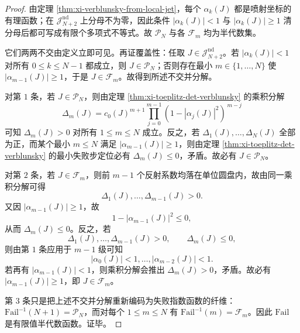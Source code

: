 \begin{proof}
由定理 \ref{thm:xi-verblunsky-from-local-jet}，每个 \(\alpha_k(J)\) 都是喷射坐标的有理函数；在 \(\mathcal J_{N+2}^{\mathrm{nd}}\) 上分母不为零，因此条件 \(|\alpha_k(J)|<1\) 与 \(|\alpha_k(J)|\ge 1\) 清分母后都可写成有限个多项式不等式。故 \(\mathcal P_N\) 与各 \(\mathcal F_m\) 均为半代数集。

它们两两不交由定义立即可见。再证覆盖性：任取 \(J\in \mathcal J_{N+2}^{\mathrm{nd}}\)。若 \(|\alpha_k(J)|<1\) 对所有 \(0\le k\le N-1\) 都成立，则 \(J\in \mathcal P_N\)；否则存在最小 \(m\in\{1,\dots,N\}\) 使 \(|\alpha_{m-1}(J)|\ge 1\)，于是 \(J\in \mathcal F_m\)。故得到所述不交并分解。

对第 \(1\) 条，若 \(J\in \mathcal P_N\)，则由定理 \ref{thm:xi-toeplitz-det-verblunsky} 的乘积分解
\[
\Delta_m(J)
=
c_0(J)^{m+1}\prod_{j=0}^{m-1}(1-|\alpha_j(J)|^2)^{\,m-j}
\]
可知 \(\Delta_m(J)>0\) 对所有 \(1\le m\le N\) 成立。反之，若 \(\Delta_1(J),\dots,\Delta_N(J)\) 全部为正，而某个最小 \(m\le N\) 满足 \(|\alpha_{m-1}(J)|\ge 1\)，则由定理 \ref{thm:xi-toeplitz-det-verblunsky} 的最小失败步定位必有 \(\Delta_m(J)\le 0\)，矛盾。故必有 \(J\in \mathcal P_N\)。

对第 \(2\) 条，若 \(J\in \mathcal F_m\)，则前 \(m-1\) 个反射系数均落在单位圆盘内，故由同一乘积分解可得
\[
\Delta_1(J),\dots,\Delta_{m-1}(J)>0.
\]
又因 \(|\alpha_{m-1}(J)|\ge 1\)，故
\[
1-|\alpha_{m-1}(J)|^2\le 0,
\]
从而 \(\Delta_m(J)\le 0\)。反之，若
\[
\Delta_1(J),\dots,\Delta_{m-1}(J)>0,
\qquad
\Delta_m(J)\le 0,
\]
则由第 \(1\) 条应用于 \(m-1\) 级可知
\[
|\alpha_0(J)|<1,\dots,|\alpha_{m-2}(J)|<1.
\]
若再有 \(|\alpha_{m-1}(J)|<1\)，则乘积分解会推出 \(\Delta_m(J)>0\)，矛盾。故必有 \(|\alpha_{m-1}(J)|\ge 1\)，即 \(J\in \mathcal F_m\)。

第 \(3\) 条只是把上述不交并分解重新编码为失败指数函数的纤维：\(\mathrm{Fail}^{-1}(N+1)=\mathcal P_N\)，而对每个 \(1\le m\le N\) 有 \(\mathrm{Fail}^{-1}(m)=\mathcal F_m\)。因此 \(\mathrm{Fail}\) 是有限值半代数函数。证毕。
\end{proof}

